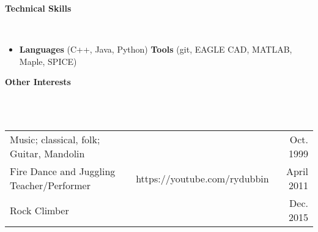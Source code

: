 \documentclass[a4paper,11pt]{article}
\newcommand{\lsep}{-0.2cm}
\newcommand{\resheading}[1]{{\small \colorbox{mygrey}{\begin{minipage}{0.975\textwidth}{\textbf{#1 \vphantom{p\^{E}}}}\end{minipage}}}}
\begin{document}

\resheading{\textbf{Technical Skills} }\\[\lsep]
\begin{itemize}
\item \noindent \textbf{Languages} (C++, Java, Python)  
\textbf{Tools} (git, EAGLE CAD, MATLAB, Maple, SPICE) 
\end{itemize} 



\resheading{\textbf{Other Interests} }\\[\lsep]
\\[0.2cm]
\indent \begin{tabular}{  l  r   r } 
\indent Music; classical, folk; Guitar, Mandolin & \indent  & \indent \indent Oct. 1999\\
\indent Fire Dance and Juggling Teacher/Performer & \indent https://youtube.com/rydubbin  & \indent  \indent April 2011\\
\indent Rock Climber & \indent  & \indent \indent Dec. 2015\\
\end{tabular}



\end{document}
